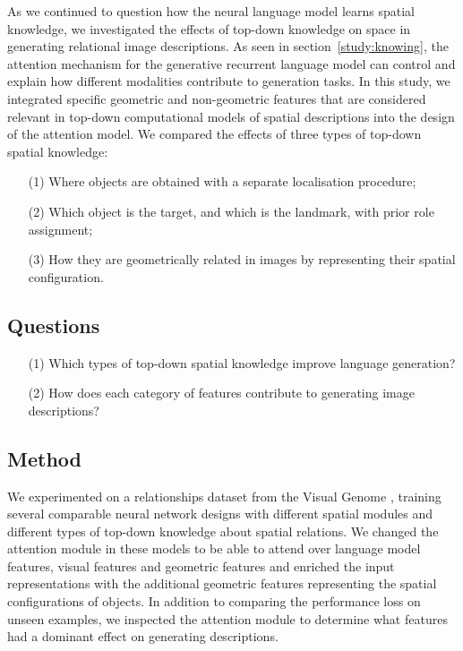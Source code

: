 As we continued to question how the neural language model learns spatial knowledge, we investigated the effects of top-down knowledge on space in generating relational image descriptions. As seen in section~\ref{study:knowing}, the attention mechanism for the generative recurrent language model can control and explain how different modalities contribute to generation tasks. In this study, we integrated 
specific geometric and non-geometric features that are considered relevant in top-down computational models
of spatial descriptions into the design of the attention model. We compared the effects of three types of top-down spatial knowledge: 
\begin{itemize}
	\item[(1)] Where objects are obtained with a separate localisation procedure;
	\item[(2)] Which object is the target, and which is the landmark, with prior role assignment;
	\item[(3)] How they are geometrically related in images by representing their spatial configuration.
\end{itemize} 

\subsection{Questions}
\begin{itemize}
	\item[(1)] Which types of top-down spatial knowledge improve language generation? 
	\item[(2)] How does each category of features contribute to generating image descriptions?
\end{itemize}

\subsection{Method}
We experimented on a relationships dataset from the Visual Genome  \cite{krishna2017visual}, training several comparable neural network designs with different spatial modules 
and different types of top-down knowledge about spatial relations. 
We changed the attention module in these models 
to be able to attend over language model features, visual features and geometric features
and enriched the %
input representations with 
the additional geometric features representing the spatial configurations of objects.
In addition to comparing the performance loss on unseen examples, we inspected the attention module to determine what features had a dominant effect on generating descriptions.


